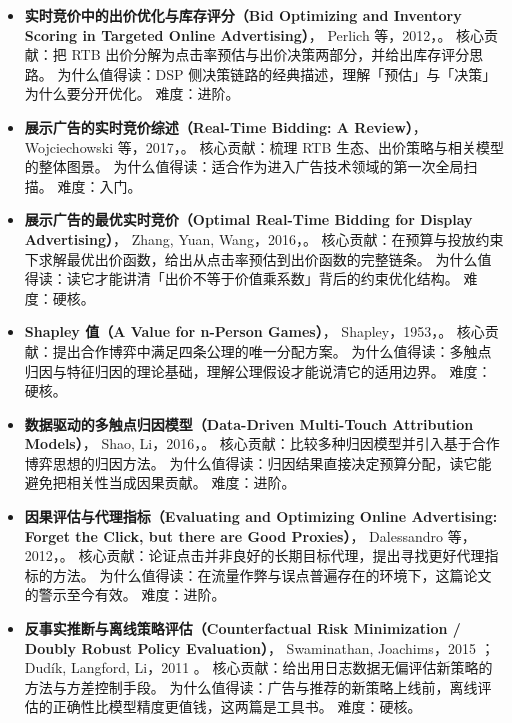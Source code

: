 \begin{itemize}
        难度：入门到进阶。
  \item \textbf{实时竞价中的出价优化与库存评分（Bid Optimizing and Inventory Scoring in Targeted Online Advertising）}，
        Perlich 等，2012，\cite{perlich2012rtb}。
        核心贡献：把 RTB 出价分解为点击率预估与出价决策两部分，并给出库存评分思路。
        为什么值得读：DSP 侧决策链路的经典描述，理解「预估」与「决策」为什么要分开优化。
        难度：进阶。
  \item \textbf{展示广告的实时竞价综述（Real-Time Bidding: A Review）}，
        Wojciechowski 等，2017，\cite{wojciechowski2017}。
        核心贡献：梳理 RTB 生态、出价策略与相关模型的整体图景。
        为什么值得读：适合作为进入广告技术领域的第一次全局扫描。
        难度：入门。
  \item \textbf{展示广告的最优实时竞价（Optimal Real-Time Bidding for Display Advertising）}，
        Zhang, Yuan, Wang，2016，\cite{zhang2016ocpc}。
        核心贡献：在预算与投放约束下求解最优出价函数，给出从点击率预估到出价函数的完整链条。
        为什么值得读：读它才能讲清「出价不等于价值乘系数」背后的约束优化结构。
        难度：硬核。
  \item \textbf{Shapley 值（A Value for n-Person Games）}，
        Shapley，1953，\cite{shapley1953value}。
        核心贡献：提出合作博弈中满足四条公理的唯一分配方案。
        为什么值得读：多触点归因与特征归因的理论基础，理解公理假设才能说清它的适用边界。
        难度：硬核。
  \item \textbf{数据驱动的多触点归因模型（Data-Driven Multi-Touch Attribution Models）}，
        Shao, Li，2016，\cite{shao2016attribution}。
        核心贡献：比较多种归因模型并引入基于合作博弈思想的归因方法。
        为什么值得读：归因结果直接决定预算分配，读它能避免把相关性当成因果贡献。
        难度：进阶。
  \item \textbf{因果评估与代理指标（Evaluating and Optimizing Online Advertising: Forget the Click, but there are Good Proxies）}，
        Dalessandro 等，2012，\cite{dalessandro2012causal}。
        核心贡献：论证点击并非良好的长期目标代理，提出寻找更好代理指标的方法。
        为什么值得读：在流量作弊与误点普遍存在的环境下，这篇论文的警示至今有效。
        难度：进阶。
  \item \textbf{反事实推断与离线策略评估（Counterfactual Risk Minimization / Doubly Robust Policy Evaluation）}，
        Swaminathan, Joachims，2015 \cite{swaminathan2015counterfactual}；
        Dud\'ik, Langford, Li，2011 \cite{dudik2011ee}。
        核心贡献：给出用日志数据无偏评估新策略的方法与方差控制手段。
        为什么值得读：广告与推荐的新策略上线前，离线评估的正确性比模型精度更值钱，这两篇是工具书。
        难度：硬核。
\end{itemize}


